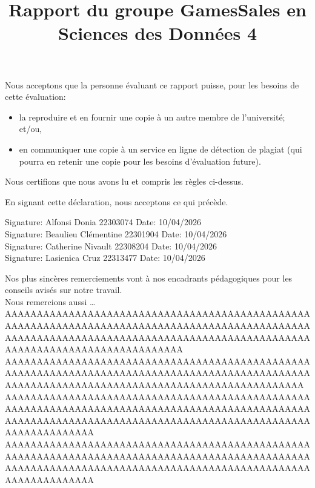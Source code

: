 \documentclass[mstat,12pt]{unswthesis}
\title{Rapport du groupe GamesSales en Sciences des Données 4  }
\author{\Authornameonly}
\begin{document}
\beforepreface




\vskip 2pc  
\noindent Nous acceptons que la personne évaluant ce rapport puisse, pour les besoins de cette évaluation:
\begin{itemize}
\item la reproduire et en fournir une copie à un autre membre de l'université; et/ou,
\item en communiquer une copie à un service en ligne de détection de plagiat (qui pourra en retenir une copie pour les besoins d'évaluation future).
\end{itemize}

\vskip 2pc 
\noindent Nous certifions que nous avons lu et compris les règles ci-dessus.\vspace{24pt}

\vskip 2pc 
\noindent En signant cette déclaration, nous acceptons ce qui précède.

\vskip 2pc 
\noindent
\noindent
Signature: Alfonsi Donia 22303074 \hfill 
Date: 10/04/2026 \\[1cm]

Signature: Beaulieu Clémentine 22301904 \hfill 
Date: 10/04/2026 \\[1cm]

Signature: Catherine Nivault 22308204 \hfill 
Date: 10/04/2026 \\[1cm]

Signature: Lasienica Cruz 22313477 \hfill 
Date: 10/04/2026 \\[1cm]

\vskip 1pc





{\bigskip}Nos plus sincères remerciements vont à nos encadrants
pédagogiques pour les conseils avisés sur notre travail.\\[1cm] Nous
remercions aussi \ldots{}\\[1cm] 

AAAAAAAAAAAAAAAAAAAAAAAAAAAAAAAAAAAAAAAAAAAAAAAAAAAAAAAAAAAAAAAAAAAAAAAAAAAAAAAAAAAAAAAAAAAAAAAAAAAAAAAAAAAAAAAAAAAAAAAAAAAAAAAAAAAAAAAAAAAAAAAAAAAAAAAAAAAAAAAAAAAAAAAAAAAA
AAAAAAAAAAAAAAAAAAAAAAAAAAAAAAAAAAAAAAAAAAAAAAAAAAAAAAAAAAAAAAAAAAAAAAAAAAAAAAAAAAAAAAAAAAAAAAAAAAAAAAAAAAAAAAAAAAAAAAAAAAAAAAAAAAAAAAAAAAAAAAA
AAAAAAAAAAAAAAAAAAAAAAAAAAAAAAAAAAAAAAAAAAAAAAAAAAAAAAAAAAAAAAAAAAAAAAAAAAAAAAAAAAAAAAAAAAAAAAAAAAAAAAAAAAAAAAAAAAAAAAAAAAAAAAAAAAAAAAAAAAAAAAAAAAAAAAAAAAAAAA
AAAAAAAAAAAAAAAAAAAAAAAAAAAAAAAAAAAAAAAAAAAAAAAAAAAAAAAAAAAAAAAAAAAAAAAAAAAAAAAAAAAAAAAAAAAAAAAAAAAAAAAAAAAAAAAAAAAAAAAAAAAAAAAAAAAAAAAAAAAAAAAAAAAAAAAAAAAAAA
\end{document}
